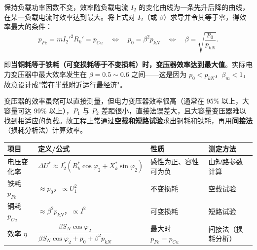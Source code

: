 
保持负载功率因数不变，效率随负载电流 $I_2$ 的变化曲线为一条先升后降的曲线，在某一负载电流时效率达到最大。将上式对 $I_2$（或 $\beta$）求导并令其等于零，得效率最大的条件：
\begin{equation}
p_{Fe}=mI_2'^{2}R_k'=p_{Cu}
\quad\Longleftrightarrow\quad
p_0=\beta^{2}p_{kN}
\quad\Longleftrightarrow\quad
\beta=\sqrt{\frac{p_0}{p_{kN}}} .
\end{equation}


即\textbf{当铜耗等于铁耗（可变损耗等于不变损耗）时，变压器效率达到最大值}。实际电力变压器中最大效率发生在 $\beta=0.5\sim0.6$ 之间——这是因为 $p_0<p_{kN}$，$\beta_m<1$，故意设计成"常在半载附近运行最经济"。

变压器的效率虽然可以直接测量，但电力变压器效率很高（通常在 95\% 以上，大容量可达 99\% 以上），$P_1$ 与 $P_2$ 差距很小，直接法误差大，且大容量变压器难以找到相适应的负载。故工程上常通过\textbf{空载和短路试验}求出铜耗和铁耗，再用\textbf{间接法}（损耗分析法）计算效率。

\begin{center}
\begin{tabular}{@{}p{1.9cm}p{3.2cm}p{4.0cm}p{3.9cm}@{}}
\toprule
项目 & 定义/公式 & 性质 & 测定方法 \\
\midrule
电压变化率 & $\Delta U^{*}\approx I_2^{*}(R_k^{*}\cos\varphi_2+X_k^{*}\sin\varphi_2)$ & 感性为正、容性可为负 & 由短路参数计算 \\
铁耗 $p_{Fe}$ & $\approx p_0$，$\propto U_1^2$ & 不变损耗 & 空载试验 \\
铜耗 $p_{Cu}$ & $\approx\beta^2p_{kN}$，$\propto I^2$ & 可变损耗 & 短路试验 \\
效率 $\eta$ & $\dfrac{\beta S_N\cos\varphi_2}{\beta S_N\cos\varphi_2+p_0+\beta^2p_{kN}}$ & 最大时 $p_{Fe}=p_{Cu}$ & 间接法（损耗分析） \\
\bottomrule
\end{tabular}
\end{center}


